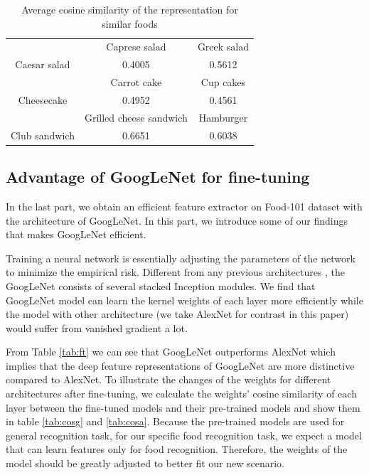 \begin{table}[htbp]
  \centering
  \caption{Average cosine similarity of the representation for similar foods}
    \begin{tabular}{c|c|c}
    \toprule
          & Caprese salad & Greek salad \\
    Caesar salad & 0.4005& 0.5612 \\
    \toprule
          & Carrot cake & Cup cakes \\
    Cheesecake & 0.4952 & 0.4561 \\
    \toprule
          & Grilled cheese sandwich & Hamburger \\
    Club sandwich & 0.6651 & 0.6038 \\
    \bottomrule
    \end{tabular}%
  \label{tab:pre_sim}%
\end{table}%

\subsection{Advantage of GoogLeNet for fine-tuning}
In the last part, we obtain an efficient feature extractor on Food-101 dataset with the architecture of GoogLeNet. In this part, we introduce some of our findings that makes GoogLeNet efficient.

Training a neural network is essentially adjusting the parameters of the network to minimize the empirical risk. Different from any previous architectures \cite{krizhevsky2012imagenet} \cite{simonyan2014very}, the GoogLeNet consists of several stacked Inception modules. We find that GoogLeNet model can learn the kernel weights of each layer more efficiently while the model with other architecture (we take AlexNet for contrast in this paper) would suffer from vanished gradient a lot.

From Table \ref{tab:ft} we can see that GoogLeNet outperforms AlexNet which implies that the deep feature representations of GoogLeNet are more distinctive compared to AlexNet.
To illustrate the changes of the weights for different architectures after fine-tuning, we calculate the weights' cosine similarity of each layer between the fine-tuned models and their pre-trained models and show them in table \ref{tab:cosg} and \ref{tab:cosa}. Because the pre-trained models are used for general recognition task, for our specific food recognition task, we expect a model that can learn features only for food recognition. Therefore, the weights of the model should be greatly adjusted to better fit our new scenario.

